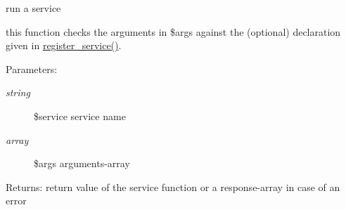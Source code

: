 run a service

this function checks the arguments in \$args against the (optional) declaration given in \hyperlink{modules_8inc_8php_e6ed600fb2ce39a4b0837bbb01fe8d6e}{register\_\-service()}. \begin{Desc}
\item[Parameters:]
\begin{description}
\item[{\em string}]\$service service name \item[{\em array}]\$args arguments-array \end{description}
\end{Desc}
\begin{Desc}
\item[Returns:]return value of the service function or a response-array in case of an error \end{Desc}
